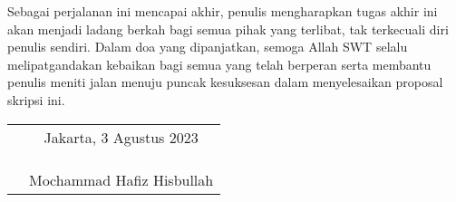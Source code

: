 Sebagai perjalanan ini mencapai akhir, penulis mengharapkan tugas akhir ini akan 
menjadi ladang berkah bagi semua pihak yang terlibat, tak terkecuali diri penulis 
sendiri. Dalam doa yang dipanjatkan, semoga Allah SWT selalu melipatgandakan kebaikan 
bagi semua yang telah berperan serta membantu penulis meniti jalan menuju puncak 
kesuksesan dalam menyelesaikan proposal skripsi ini.

\vspace{2cm}

\begin{tabular}{p{7.5cm}c}
	&Jakarta, 3 Agustus 2023\\
	&\\
	&\\
	&\\
	&Mochammad Hafiz Hisbullah
\end{tabular}
